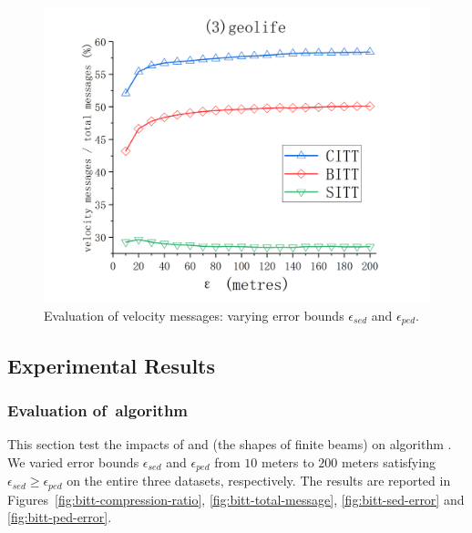 {{\begin{figure}[tb!]
	\includegraphics[scale = 0.580]{figures/Fig-geolife-speed-messages.png}\hspace{0ex}
	\vspace{-2ex}
	\caption{\small Evaluation of velocity messages: varying error bounds $\epsilon_{sed}$ and $\epsilon_{ped}$.}
	\label{fig:speed-message}
	\vspace{-1ex}
\end{figure}
}%



\subsection{Experimental Results}

\subsubsection{Evaluation of~algorithm \bitt}
This section test the impacts of \ped and \sed (\ie the shapes of finite beams) on algorithm \bitt. We varied error bounds $\epsilon_{sed}$ and $\epsilon_{ped}$ from $10$ meters to $200$ meters satisfying $\epsilon_{sed} \ge \epsilon_{ped}$ on the entire three datasets, respectively. The results are reported in Figures~\ref{fig:bitt-compression-ratio}, \ref{fig:bitt-total-message}, \ref{fig:bitt-sed-error} and \ref{fig:bitt-ped-error}.


}
